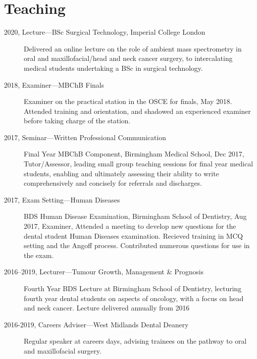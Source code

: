 \section*{Teaching}
\begin{description}
	\item[2020, Lecture---BSc Surgical Technology, Imperial College London]{Delivered an online lecture on the role of ambient mass spectrometry in oral and maxillofacial/head and neck cancer surgery, to intercalating medical students undertaking a BSc in surgical technology.}
	\item[2018, Examiner---MBChB Finals]{Examiner on the practical station in the OSCE for finals, May 2018. Attended training and orientation, and shadowed an experienced examiner before taking charge of the station.}
	\item[2017, Seminar---Written Professional Communication]{Final Year MBChB Component, Birmingham Medical School, Dec 2017, Tutor/Assessor, leading small group teaching sessions for final year medical students, enabling and ultimately assessing their ability to write comprehensively and concisely for referrals and discharges.}
	\item[2017, Exam Setting---Human Diseases]{BDS Human Disease Examination, Birmingham School of Dentistry, Aug 2017, Examiner, Attended a meeting to develop new questions for the dental student Human Diseases examination. Recieved training in MCQ setting and the Angoff process. Contributed numerous questions for use in the exam.}
	\item[2016--2019, Lecturer---Tumour Growth, Management \& Prognosis]{Fourth Year BDS Lecture at Birmingham School of Dentistry, lecturing fourth year dental students on aspects of oncology, with a focus on head and neck cancer. Lecture delivered annually from 2016}
	\item[2016-2019, Careers Adviser---West Midlands Dental Deanery]{Regular speaker at careers days, advising trainees on the pathway to oral and maxillofacial surgery.}
\end{description}

